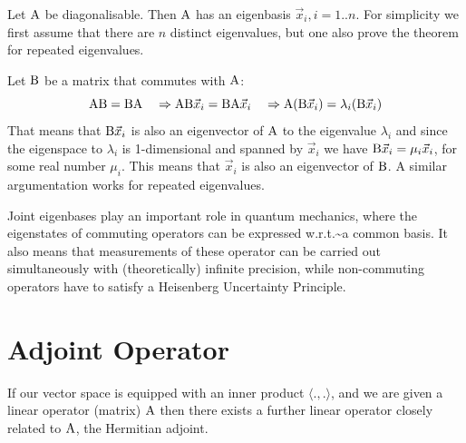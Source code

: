 \documentclass[
  a4paper,
  DIV=11,
  numbers=noendperiod,
  oneside]{scrreprt}
\theoremstyle{definition}
\theoremstyle{remark}
\newenvironment{fbx}[3]{\begin{tcolorbox}[enhanced, breakable,%
attach boxed title to top*={xshift=1.4pt},
boxed title style={boxrule=0.0mm, fuzzy shadow={1pt}{-1pt}{0mm}{0.1mm}{gray}, arc=.3em, rounded corners=east, sharp corners=west}, colframe=#1-color2, colbacktitle=#1-color1, colback = white, coltitle=black,  titlerule=0mm, toprule=0pt, bottomrule=.7pt, leftrule=.3em, rightrule=0pt, outer arc=.3em,  arc=0pt,	 sharp corners = east, left=.5em, bottomtitle=1mm, toptitle=1mm,title=\textbf{#2}\hspace{0.5em}{#3}]}
{\end{tcolorbox}}
\begin{document}
\label{Proofux2a-5.11}
\begin{fbx}{Proof}{Proof}{}
\label{Proof*-5.11}
Let \({\rm A}\) be diagonalisable. Then \({\rm A}\) has an eigenbasis
\(\vec{x}_i, i=1..n\). For simplicity we first assume that there are
\(n\) distinct eigenvalues, but one also prove the theorem for repeated
eigenvalues.

Let \({\rm B}\) be a matrix that commutes with \({\rm A}\):\\
\[ {\rm A B = B A} \quad \Rightarrow {\rm A B}\vec{x}_i ={\rm B A}\vec{x}_i \quad \Rightarrow {\rm A}({\rm  B}\vec{x}_i) = \lambda_i ({\rm B} \vec{x}_i)  \]
That means that \({\rm B} \vec{x}_i\) is also an eigenvector of
\({\rm A}\) to the eigenvalue \(\lambda_i\) and since the eigenspace to
\(\lambda_i\) is 1-dimensional and spanned by \(\vec{x}_i\) we have
\({\rm B} \vec{x}_i = \mu_i \vec{x}_i\), for some real number \(\mu_i\).
This means that \(\vec{x}_i\) is also an eigenvector of \({\rm B}\). A
similar argumentation works for repeated eigenvalues.

\end{fbx}

\begin{tcolorbox}[enhanced jigsaw, titlerule=0mm, opacityback=0, coltitle=black, opacitybacktitle=0.6, colframe=quarto-callout-note-color-frame, colback=white, leftrule=.75mm, colbacktitle=quarto-callout-note-color!10!white, toprule=.15mm, bottomtitle=1mm, breakable, toptitle=1mm, rightrule=.15mm, title=\textcolor{quarto-callout-note-color}{\faInfo}\hspace{0.5em}{Remark}, left=2mm, bottomrule=.15mm, arc=.35mm]

Joint eigenbases play an important role in quantum mechanics, where the
eigenstates of commuting operators can be expressed
w.r.t.\textasciitilde a common basis. It also means that measurements of
these operator can be carried out simultaneously with (theoretically)
infinite precision, while non-commuting operators have to satisfy a
Heisenberg Uncertainty Principle.

\end{tcolorbox}

\section{Adjoint Operator}\label{adjoint-operator}

If our vector space is equipped with an inner product
\(\langle . , . \rangle\), and we are given a linear operator (matrix)
\({\rm A}\) then there exists a further linear operator closely related
to \({\rm A}\), the Hermitian adjoint.
\end{document}
